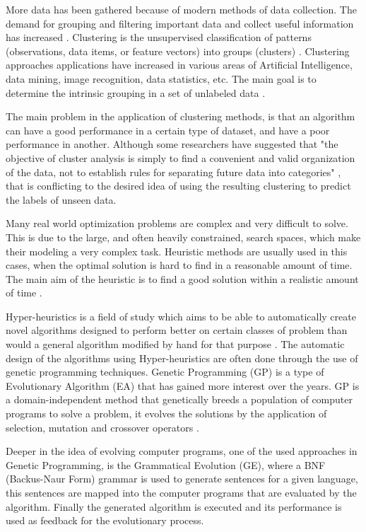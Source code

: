 \documentclass[journal]{IEEEtran}
\begin{document}
More data has been gathered because of modern methods of data collection. The demand for grouping and filtering important data and collect useful information has increased \cite{ahalya2015data}. Clustering is the unsupervised classification of patterns (observations, data items, or feature vectors) into groups (clusters) \cite{jain1988algorithms}. Clustering approaches applications have increased in various areas of Artificial Intelligence, data mining, image recognition, data statistics, etc. The main goal is to determine the intrinsic grouping in a set of unlabeled data \cite{ahalya2015data}.

The main problem in the application of clustering methods, is that an algorithm can have a good performance in a certain type of dataset, and have a poor performance in another. Although some researchers have suggested that "the objective of cluster analysis is simply to find a convenient and valid organization of the data, not to establish rules for separating future data into categories" \cite{jain1988algorithms}, that is conflicting to the desired idea of using the resulting clustering to predict the labels of unseen data.

Many real world optimization problems are complex and very difficult to solve. This is due to the large, and often heavily constrained, search spaces, which make their modeling a very complex task. Heuristic methods are usually used in this cases, when the optimal solution is hard to find in a reasonable amount of time. The main aim of the heuristic is to find a good solution within a realistic amount of time \cite{sabar2013grammatical}.

Hyper-heuristics is a field of study which aims to be able to automatically create novel algorithms designed to perform better on certain classes of problem than would a general algorithm modified by hand for that purpose \cite{harris2015comparison}. The automatic design of the algorithms using Hyper-heuristics are often done through the use of genetic programming techniques. Genetic Programming (GP) is a type of Evolutionary Algorithm (EA) that has gained more interest over the years. GP is a domain-independent method that genetically breeds a population of computer programs to solve a problem, it evolves the solutions by the application of selection, mutation and crossover operators \cite{poli2014genetic}.

Deeper in the idea of evolving computer programs, one of the used approaches in Genetic Programming, is the Grammatical Evolution (GE), where a BNF (Backus-Naur Form) grammar is used to generate sentences for a given language, this sentences are mapped into the computer programs that are evaluated by the algorithm. Finally the generated algorithm is executed and its performance is used as feedback for the evolutionary process.
\end{document}
